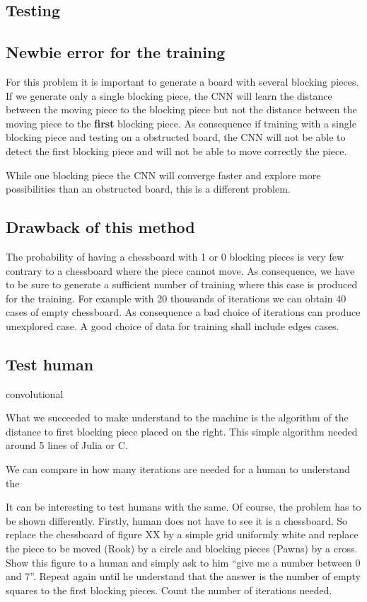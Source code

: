 \documentclass[a4paper,10pt]{article}
\begin{document}
\subsection{Testing}



\subsection{Newbie error for the training}

For this problem it is important to generate a board with several blocking
pieces. If we generate only a single blocking piece, the CNN will learn the
distance between the moving piece to the blocking piece but not the distance
between the moving piece to the \textbf{first} blocking piece. As consequence if
training with a single blocking piece and testing on a obstructed board, the CNN
will not be able to detect the first blocking piece and will not be able to move
correctly the piece.

While one blocking piece the CNN will converge faster and explore more
possibilities than an obstructed board, this is a different problem.

\subsection{Drawback of this method}

The probability of having a chessboard with 1 or 0 blocking pieces is very few
contrary to a chessboard where the piece cannot move. As consequence, we have to
be sure to generate a sufficient number of training where this case is produced
for the training. For example with 20 thousands of iterations we can obtain 40
cases of empty chessboard. As consequence a bad choice of iterations can produce
unexplored case. A good choice of data for training shall include edges cases.

\subsection{Test human} convolutional

What we succeeded to make understand to the machine is the algorithm of the
distance to first blocking piece placed on the right. This simple algorithm
needed around 5 lines of Julia or C.

We can compare in how many iterations are needed for a human to understand the

It can be interesting to test humans with the same. Of course, the problem has
to be shown differently. Firstly, human does not have to see it is a chessboard.
So replace the chessboard of figure XX by a simple grid uniformly white and
replace the piece to be moved (Rook) by a circle and blocking pieces (Pawns) by
a cross. Show this figure to a human and simply ask to him ``give me a number
between 0 and 7''. Repeat again until he understand that the answer is the
number of empty squares to the first blocking pieces. Count the
number of iterations needed.
\end{document}
